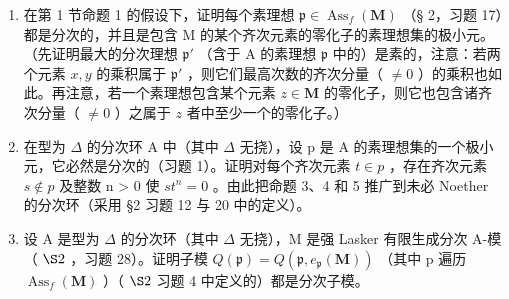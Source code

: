 
\begin{enumerate}
\def\labelenumi{\arabic{enumi}.}
\item
  在第 1 节命题 1 的假设下，证明每个素理想 \(\mathfrak{p} \in \operatorname{Ass}_f(\mathbf{M})\) （§ 2，习题 17）都是分次的，并且是包含 M 的某个齐次元素的零化子的素理想集的极小元。（先证明最大的分次理想 \(\mathfrak{p}'\) （含于 A 的素理想 \(\mathfrak{p}\) 中的）是素的，注意：若两个元素 \(x, y\) 的乘积属于 \(\mathfrak{p}'\) ，则它们最高次数的齐次分量（ \(\neq 0\) ）的乘积也如此。再注意，若一个素理想包含某个元素 \(z \in \mathbf{M}\) 的零化子，则它也包含诸齐次分量（ \(\neq 0\) ）之属于 \(z\) 者中至少一个的零化子。）
\item
  在型为 \(\Delta\) 的分次环 A 中（其中 \(\Delta\) 无挠），设 p 是 A 的素理想集的一个极小元，它必然是分次的（习题 1）。证明对每个齐次元素 \(t \in p\) ，存在齐次元素 \(s \notin p\) 及整数 n \textgreater{} 0 使 \(st^{n} = 0\) 。由此把命题 3、4 和 5 推广到未必 Noether 的分次环（采用 §2 习题 12 与 20 中的定义）。
\item
  设 A 是型为 \(\Delta\) 的分次环（其中 \(\Delta\) 无挠），M 是强 Lasker 有限生成分次 A-模（ \(\S 2\) ，习题 28）。证明子模 \(Q(\mathfrak{p}) = Q(\mathfrak{p}, e_{\mathfrak{p}}(\mathbf{M}))\) （其中 p 遍历 \(\operatorname{Ass}_{f}(\mathbf{M})\) ）（ \(\S 2\) 习题 4 中定义的）都是分次子模。
\end{enumerate}

